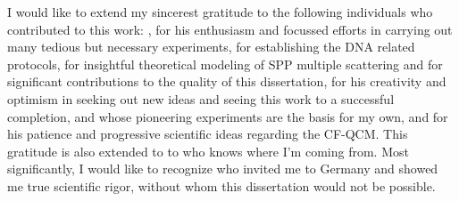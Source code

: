 I would like to extend my sincerest gratitude to the following individuals
who contributed to this work: , for his enthusiasm and
focussed efforts in carrying out many tedious but necessary experiments,
 for establishing the DNA related protocols,
 for insightful theoretical modeling of SPP multiple
scattering and for significant contributions to the quality of this
dissertation,  for his creativity and optimism in
seeking out new ideas and seeing this work to a successful completion,
 and  whose pioneering
experiments are the basis for my own, and  for his patience
and progressive scientific ideas regarding the CF-QCM. This gratitude is
also extended to to  who knows where I'm coming from.
Most significantly, I would like to recognize  who
invited me to Germany and showed me true scientific rigor, without whom
this dissertation would not be possible.
